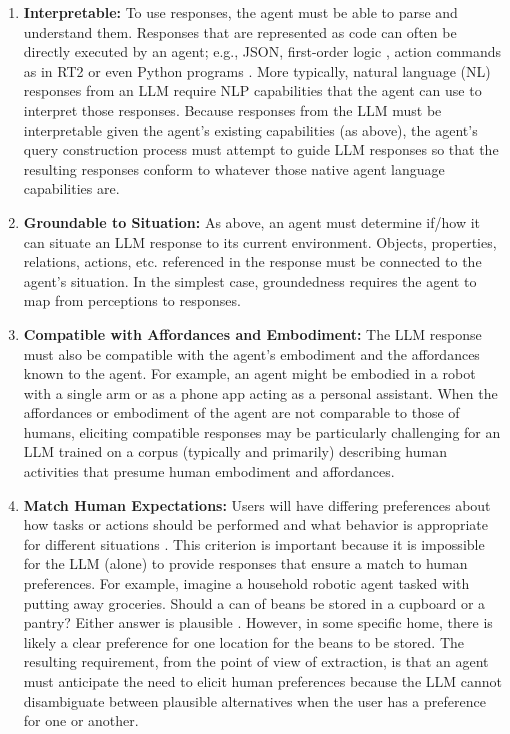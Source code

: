 \documentclass[letterpaper]{article} %
\begin{document}
\begin{enumerate}


\item \textbf{Interpretable:} To use responses, the agent must be able to parse and understand them. Responses that are represented as code can often be directly executed by an agent; e.g., JSON, first-order logic \cite{olmo_gpt3--plan_2021}, action commands as in RT2 \cite{brohan_rt-2_2023} or even Python programs \cite{singh_progprompt_2023}. More typically, natural language (NL) responses from an LLM require NLP capabilities that the agent can use to interpret those responses. Because responses from the LLM must be interpretable given the agent's existing capabilities (as above), the agent's query construction process must attempt to guide LLM responses so that the resulting responses conform to whatever those native agent language capabilities are.

\item \textbf{Groundable to Situation:} As above, an agent must determine if/how it can situate an LLM response to its current environment. Objects, properties, relations, actions, etc. referenced in the response must be connected to the agent's situation. In the simplest case, groundedness requires the agent to map from perceptions to responses.

\item \textbf{Compatible with Affordances and Embodiment:} The LLM response must also be compatible with the agent's embodiment and the affordances known to the agent. For example, an agent might be embodied in a robot with a single arm or as a phone app acting as a personal assistant. When the affordances or embodiment of the agent are not comparable to those of humans, eliciting compatible responses may be particularly challenging for an LLM trained on a corpus (typically and primarily) describing human activities that presume human embodiment and affordances.

\item \textbf{Match Human Expectations:} Users will have differing preferences about how tasks or actions should be performed and what behavior is appropriate for different situations \cite{kirk_improving_2022}. This criterion is important because it is impossible for the LLM (alone) to provide responses that ensure a match to human preferences. For example, imagine a household robotic agent tasked with putting away groceries. Should a can of beans be stored in a cupboard or a pantry? Either answer is plausible \cite{lenat_getting_2023}. However, in some specific home, there is likely a clear preference for one location for the beans to be stored. The resulting requirement, from the point of view of extraction, is that an agent must anticipate the need to elicit human preferences because the LLM cannot disambiguate between plausible alternatives when the user has a preference for one or another.

\end{enumerate}
\end{document}
